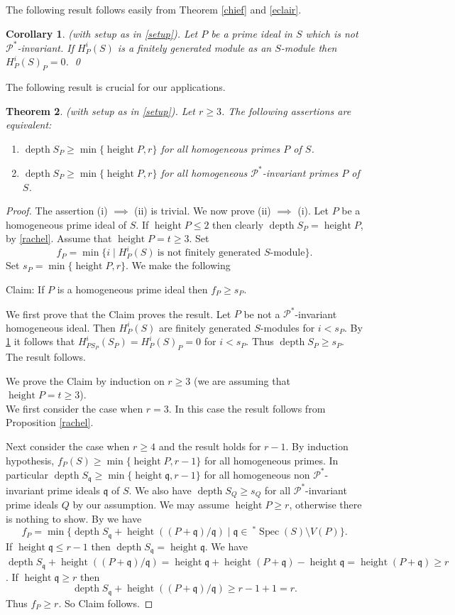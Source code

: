 \documentclass{amsart}
\newcommand{\q}{\mathfrak{q} }
\newcommand{\Pc}{\mathcal{P} }
\newcommand{\depth}{\operatorname{depth}}
\newcommand{\height}{\operatorname{height}}
\newcommand{\Spec}{\operatorname{Spec}}
\theoremstyle{plain}
\newtheorem{theorem}{Theorem}[section]
\newtheorem{corollary}[theorem]{Corollary}
\theoremstyle{definition}
\theoremstyle{remark}
\begin{document}
The following result follows easily from Theorem \ref{chief} and \ref{eclair}.
\begin{corollary}
\label{stock}(with setup as in \ref{setup}). Let $P$ be a prime ideal in $S$ which is \emph{not} $\Pc^*$-invariant. If $H^i_P(S)$ is a finitely generated module as an $S$-module then $H^i_P(S)_P = 0$. \qed
\end{corollary}
The following result is crucial for our applications.
\begin{theorem}\label{crucial}
(with setup as in \ref{setup}). Let $r \geq 3$. The following assertions are equivalent:
\begin{enumerate}[\rm (i)]
\item
$\depth S_P \geq \min \{ \height P, r \}$ for all homogeneous primes $P$ of $S$.
\item
$\depth S_P \geq \min \{ \height P, r \}$ for all homogeneous $\Pc^*$-invariant primes $P$ of $S$.
\end{enumerate}
\end{theorem}
\begin{proof}
The assertion (i) $\implies$ (ii) is trivial.
We now prove (ii) $\implies$ (i). Let $P$ be a homogeneous  prime ideal of $S$. If $\height P \leq 2$ then clearly  $\depth S_P = \height P$, by \ref{rachel}.
Assume that $\height P  = t \geq 3$. Set
$$f_P = \min \{ i \mid H^i_P(S) \ \text{is not finitely generated $S$-module} \}. $$
Set $s_P = \min \{ \height P, r \}$.
We make the following

Claim: If $P$ is  a homogeneous prime ideal then $f_P \geq  s_P$.

We first prove that the Claim proves the result. Let  $P$ be not a $\Pc^*$-invariant homogeneous  ideal. Then $H^i_P(S)$ are finitely generated $S$-modules for $i < s_P$.  By \ref{stock} it follows that $H^i_{PS_P}(S_P) = H^i_{P}(S)_P = 0$ for $i < s_P$. Thus $\depth S_P \geq s_P$. The result follows.

We prove the Claim by induction on $r \geq 3$ (we are assuming that $\height P = t \geq 3$). \\
We first consider the case when $r = 3$. In this case the result follows from Proposition \ref{rachel}.

Next consider the case when $r \geq 4$ and the result holds for $r - 1$.
By induction hypothesis, $f_P(S) \geq \min \{ \height P, r - 1 \}$ for all homogeneous primes.   In particular $\depth S_\q \geq  \min \{\height \q, r - 1 \}$ for all homogeneous non $\Pc^*$-invariant prime ideals $\q$ of $S$. We also have $\depth  S_Q \geq s_Q$ for all $\Pc^*$-invariant prime ideals $Q$ by our assumption.
We may assume $\height P \geq r$, otherwise there is nothing to show.
 By \cite[13.1.17]{bs} we have
\[
f_P = \min \{ \depth S_\q  + \height((P+\q)/\q) \mid \q \in \  ^* \Spec(S) \setminus V(P) \}.
\]
If $\height \q \leq r -1$ then $\depth S_\q = \height \q$. We have $\depth S_\q + \height((P+\q)/\q) = \height \q + \height(P + \q) - \height \q = \height (P + \q) \geq r$.
If $\height \q \geq r$ then $$\depth S_\q  + \height((P+\q)/\q)  \geq r - 1 + 1 = r.$$
Thus $f_P \geq r$. So Claim follows.
\end{proof}
\end{document}
